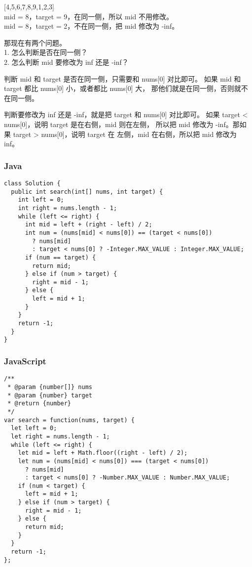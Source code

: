 [4,5,6,7,8,9,1,2,3] \\
mid = 8，target = 9，在同一侧，所以 mid 不用修改。\\
mid = 8，target = 2，不在同一侧，把 mid 修改为 -inf。

那现在有两个问题。\\
1. 怎么判断是否在同一侧？ \\
2. 怎么判断 mid 要修改为 inf 还是 -inf？

判断 mid 和 target 是否在同一侧，只需要和 nums[0] 对比即可。
如果 mid 和 target 都比 nums[0] 小，或者都比 nums[0] 大，
那他们就是在同一侧，否则就不在同一侧。

判断要修改为 inf 还是 -inf，就是把 target 和 nums[0] 对比即可。
如果 target < nums[0]，说明 target 是在右侧，mid 则在左侧，
所以把 mid 修改为 -inf。那如果 target > nums[0]，说明 target 在
左侧，mid 在右侧，所以把 mid 修改为 inf。

\subsubsection{Java}

\begin{verbatim}
class Solution {
  public int search(int[] nums, int target) {
    int left = 0;
    int right = nums.length - 1;
    while (left <= right) {
      int mid = left + (right - left) / 2;
      int num = (nums[mid] < nums[0]) == (target < nums[0])
        ? nums[mid]
        : target < nums[0] ? -Integer.MAX_VALUE : Integer.MAX_VALUE;
      if (num == target) {
        return mid;
      } else if (num > target) {
        right = mid - 1;
      } else {
        left = mid + 1;
      }
    }
    return -1;
  }
}
\end{verbatim}

\subsubsection{JavaScript}

\begin{verbatim}
/**
 * @param {number[]} nums
 * @param {number} target
 * @return {number}
 */
var search = function(nums, target) {
  let left = 0;
  let right = nums.length - 1;
  while (left <= right) {
    let mid = left + Math.floor((right - left) / 2);
    let num = (nums[mid] < nums[0]) === (target < nums[0])
      ? nums[mid]
      : target < nums[0] ? -Number.MAX_VALUE : Number.MAX_VALUE;
    if (num < target) {
      left = mid + 1;
    } else if (num > target) {
      right = mid - 1;
    } else {
      return mid;
    }
  }
  return -1;
};
\end{verbatim}

